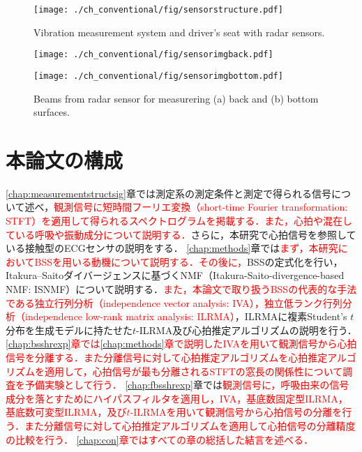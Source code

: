 \begin{figure}[!t]
\centering
\texttt{[image: ./ch\_conventional/fig/sensorstructure.pdf]}
\caption{Vibration measurement system and driver's seat with radar sensors.}
\label{fig:sensorstructure}
\end{figure}

\begin{figure}[htbp]
      \begin{minipage}[t]{0.45\hsize}
        \centering
        \texttt{[image: ./ch\_conventional/fig/sensorimgback.pdf]}
        \label{fig:sensorimgback}
      \end{minipage} 
      \begin{minipage}[t]{0.45\hsize}
        \centering
        \texttt{[image: ./ch\_conventional/fig/sensorimgbottom.pdf]}
        \label{fig:sensorimgbottom}
      \end{minipage} 
     \caption{Beams from radar sensor for measurering (a) back and (b) bottom surfaces.}
     \label{fig:sensorimg}
  \end{figure}


\section{本論文の構成}
\ref{chap:measurementstructsig}章では測定系の測定条件と測定で得られる信号について述べ，\textcolor{red}{観測信号に短時間フーリエ変換（short-time Fourier transformation: STFT）を適用して得られるスペクトログラムを掲載する．また，心拍や混在している呼吸や振動成分について説明する．}さらに，本研究で心拍信号を参照している接触型のECGセンサの説明をする．
\ref{chap:methods}章では\textcolor{red}{まず，本研究においてBSSを用いる動機について説明する．その後に，}BSSの定式化を行い，Itakura--Saitoダイバージェンスに基づくNMF（Itakura-Saito-divergence-based NMF: ISNMF）について説明する．\textcolor{red}{また，本論文で取り扱うBSSの代表的な手法である独立行列分析（independence vector analysis: IVA），独立低ランク行列分析（independence low-rank matrix analysis: ILRMA）}，ILRMAに複素Student's $t$分布を生成モデルに持たせた$t$-ILRMA及び心拍推定アルゴリズムの説明を行う．
\textcolor{red}{\ref{chap:bsshrexp}章では\ref{chap:methods}章で説明したIVAを用いて観測信号から心拍信号を分離する．また分離信号に対して心拍推定アルゴリズムを心拍推定アルゴリズムを適用して，心拍信号が最も分離されるSTFTの窓長の関係性について調査を予備実験として行う．}
\ref{chap:fbsshrexp}章では\textcolor{red}{観測信号に，呼吸由来の信号成分を落とすためにハイパスフィルタを適用し，IVA，基底数固定型ILRMA，基底数可変型ILRMA，及び$t$-ILRMAを用いて観測信号から心拍信号の分離を行う．また分離信号に対して心拍推定アルゴリズムを適用して心拍信号の分離精度の比較を行う．
\ref{chap:con}章ではすべての章の総括した結言を述べる．}